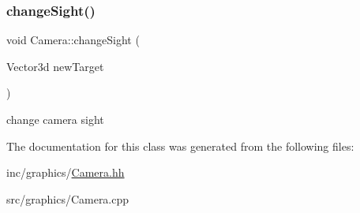 \subsubsection{\texorpdfstring{change\+Sight()}{changeSight()}}
{\footnotesize\ttfamily void Camera\+::change\+Sight (\begin{DoxyParamCaption}\item[{Vector3d}]{new\+Target }\end{DoxyParamCaption})}



change camera sight 



The documentation for this class was generated from the following files\+:\begin{DoxyCompactItemize}
\item 
inc/graphics/\hyperlink{Camera_8hh}{Camera.\+hh}\item 
src/graphics/Camera.\+cpp\end{DoxyCompactItemize}
